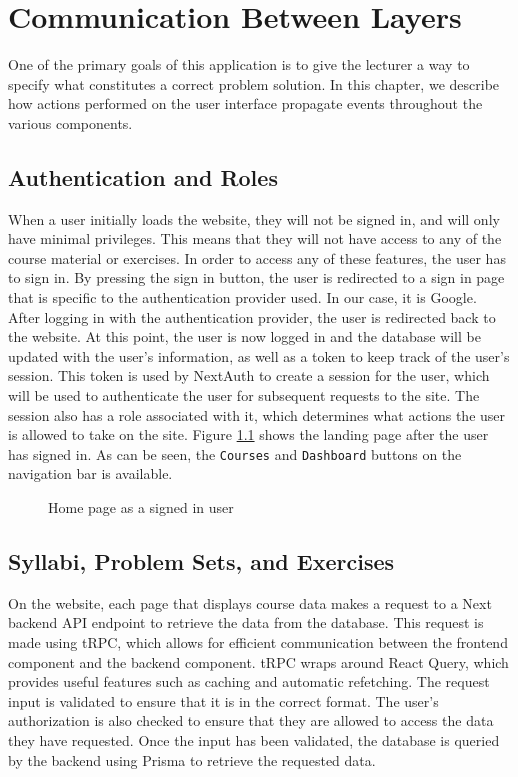 \chapter{Communication Between Layers} \label{chap:Frontend}
One of the primary goals of this application is to give the lecturer a way to specify what constitutes a correct problem solution. In this chapter, we describe how actions performed on the user interface propagate events throughout the various components.

\section{Authentication and Roles}
When a user initially loads the website, they will not be signed in, and will only have minimal privileges.
This means that they will not have access to any of the course material or exercises.
In order to access any of these features, the user has to sign in.
By pressing the sign in button, the user is redirected to a sign in page that is specific to the authentication provider used.
In our case, it is Google.
After logging in with the authentication provider, the user is redirected back to the website.
At this point, the user is now logged in and the database will be updated with the user's information, as well as a token to keep track of the user's session.
This token is used by NextAuth to create a session for the user, which will be used to authenticate the user for subsequent requests to the site.
The session also has a role associated with it, which determines what actions the user is allowed to take on the site.
Figure \ref{fig:Home page} shows the landing page after the user has signed in. As can be seen, the \texttt{Courses} and \texttt{Dashboard} buttons on the navigation bar is available.
\begin{figure}[H]
    \centering
    \caption{Home page as a signed in user}
    \label{fig:Home page}
\end{figure}

\section{Syllabi, Problem Sets, and Exercises}
On the website, each page that displays course data makes a request to a Next backend API endpoint to retrieve the data from the database.
This request is made using tRPC, which allows for efficient communication between the frontend component and the backend component. tRPC wraps around React Query, which provides useful features such as caching and automatic refetching.
The request input is validated to ensure that it is in the correct format.
The user's authorization is also checked to ensure that they are allowed to access the data they have requested.
Once the input has been validated, the database is queried by the backend using Prisma to retrieve the requested data.

